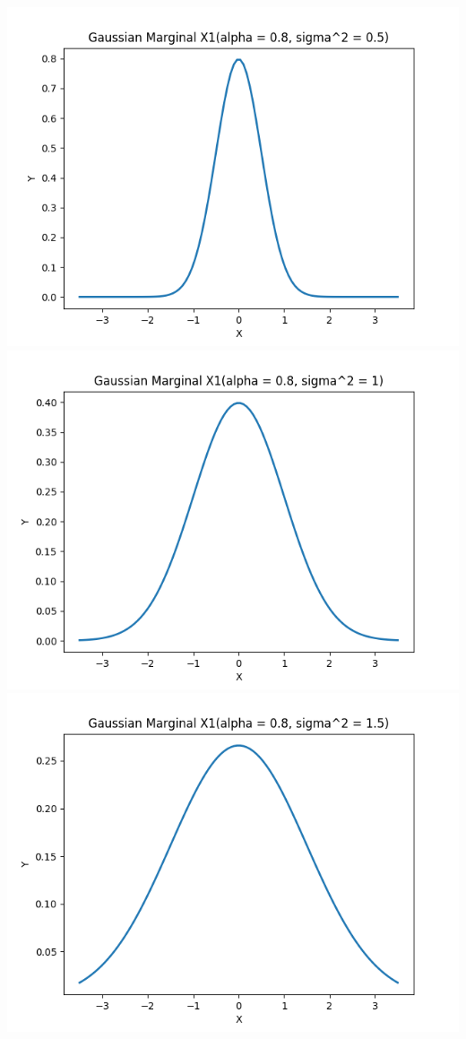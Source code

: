 \documentclass{article}
\begin{document}
\includegraphics[width=\linewidth]{X1(alpha = 0.8, sigma^2 = 0.5).png}
\includegraphics[width=\linewidth]{X1(alpha = 0.8, sigma^2 = 1).png}
\includegraphics[width=\linewidth]{X1(alpha = 0.8, sigma^2 = 1.5).png}
\end{document}
